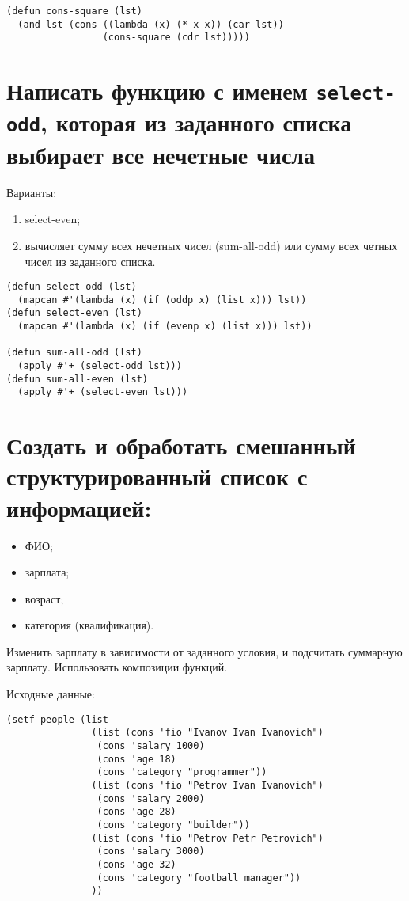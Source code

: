 \begin{lstlisting}
(defun cons-square (lst)
  (and lst (cons ((lambda (x) (* x x)) (car lst))
                 (cons-square (cdr lst)))))
\end{lstlisting}

\section{Написать функцию с именем \texttt{select-odd}, которая из заданного списка выбирает все нечетные числа}

Варианты:
\begin{enumerate}
    \item select-even;
    \item вычисляет сумму всех нечетных чисел (sum-all-odd) или сумму всех четных чисел из заданного списка.
\end{enumerate}

\begin{lstlisting}
(defun select-odd (lst)
  (mapcan #'(lambda (x) (if (oddp x) (list x))) lst))
(defun select-even (lst)
  (mapcan #'(lambda (x) (if (evenp x) (list x))) lst))

(defun sum-all-odd (lst)
  (apply #'+ (select-odd lst)))
(defun sum-all-even (lst)
  (apply #'+ (select-even lst)))
\end{lstlisting}


\section{Создать и обработать смешанный структурированный список с информацией:}

\begin{itemize}
    \item ФИО;
    \item зарплата;
    \item возраст;
    \item категория (квалификация).
\end{itemize}

Изменить зарплату в зависимости от заданного условия, и подсчитать суммарную зарплату. Использовать композиции функций.

Исходные данные:

\begin{lstlisting}
(setf people (list
               (list (cons 'fio "Ivanov Ivan Ivanovich")
                (cons 'salary 1000)
                (cons 'age 18)
                (cons 'category "programmer"))
               (list (cons 'fio "Petrov Ivan Ivanovich")
                (cons 'salary 2000)
                (cons 'age 28)
                (cons 'category "builder"))
               (list (cons 'fio "Petrov Petr Petrovich")
                (cons 'salary 3000)
                (cons 'age 32)
                (cons 'category "football manager"))
               ))
\end{lstlisting}


